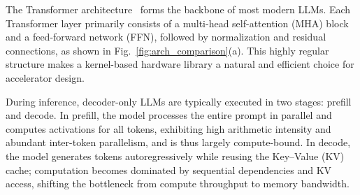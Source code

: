 \documentclass[conference]{IEEEtran}
\begin{document}


The Transformer architecture~\cite{vaswani2017attention} forms the backbone of most modern LLMs. Each Transformer layer primarily consists of a multi-head self-attention (MHA) block and a feed-forward network (FFN), followed by normalization and residual connections, as shown in Fig.~\ref{fig:arch_comparison}(a). This highly regular structure makes a kernel-based hardware library a natural and efficient choice for accelerator design.

During inference, decoder-only LLMs are typically executed in two stages: prefill and decode. In prefill, the model processes the entire prompt in parallel and computes activations for all tokens, exhibiting high arithmetic intensity and abundant inter-token parallelism, and is thus largely compute-bound. In decode, the model generates tokens autoregressively while reusing the Key--Value (KV) cache; computation becomes dominated by sequential dependencies and KV access, shifting the bottleneck from compute throughput to memory bandwidth.
\end{document}
